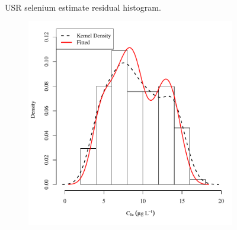 \begin{linenumbers}
\begin{landscape}
\begin{figure}
\begin{subfigure}{0.7\textwidth}
		\end{subfigure}\\
		\caption{USR selenium estimate residual histogram.}
	\end{figure}
\end{landscape}

\subfiguremid
\begin{landscape}
	\begin{figure}
		\begin{subfigure}{0.7\textwidth}
			\centering
			\includegraphics[width=\tableCustomSize]{"Figures/Results_USR/Stochastic/Conc Model ResDist UDIV"}
		\end{subfigure}%
		\begin{subfigure}{0.7\textwidth}
			\centering

\end{subfigure}
\end{figure}
\end{landscape}
\end{linenumbers}

